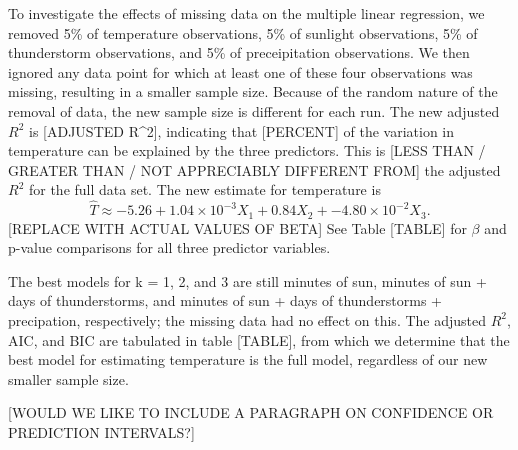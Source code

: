 To investigate the effects of missing data on the multiple linear regression, we removed 5\% of temperature observations, 5\% of sunlight observations, 5\% of thunderstorm observations, and 5\% of preceipitation observations. We then ignored any data point for which at least one of these four observations was missing, resulting in a smaller sample size. Because of the random nature of the removal of data, the new sample size is different for each run. The new adjusted $R^{2}$ is [ADJUSTED R^2], indicating that [PERCENT] of the variation in temperature can be explained by the three predictors. This is [LESS THAN / GREATER THAN / NOT APPRECIABLY DIFFERENT FROM] the adjusted $R^{2}$ for the full data set. The new estimate for temperature is $$\hat{T} \approx -5.26 + 1.04 \times 10^{-3}X_{1} + 0.84X_{2} + -4.80\times 10^{-2}X_{3}.$$ [REPLACE WITH ACTUAL VALUES OF BETA] See Table [TABLE] for $\beta$ and p-value comparisons for all three predictor variables. 

The best models for k = 1, 2, and 3 are still minutes of sun, minutes of sun + days of thunderstorms, and minutes of sun + days of thunderstorms + precipation, respectively; the missing data had no effect on this. The adjusted $R^{2}$, AIC, and BIC are tabulated in table [TABLE], from which we determine that the best model for estimating temperature is the full model, regardless of our new smaller sample size.

[WOULD WE LIKE TO INCLUDE A PARAGRAPH ON CONFIDENCE OR PREDICTION INTERVALS?]
